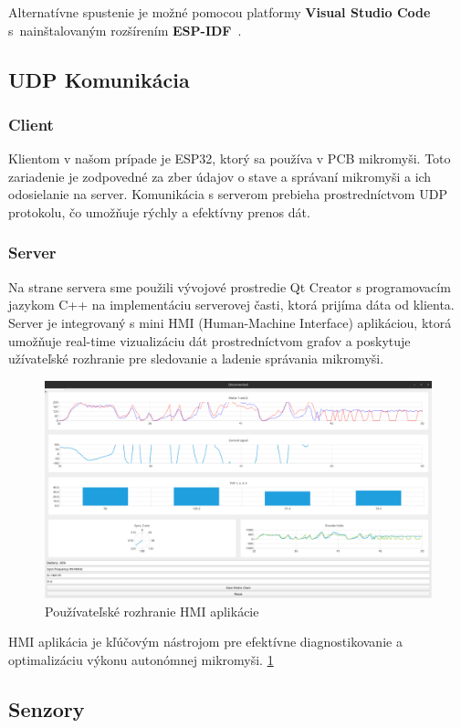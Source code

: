 Alternatívne spustenie je možné pomocou platformy \textbf{Visual Studio Code} s~nainštalovaným rozšírením
\textbf{ESP-IDF}~\cite{espIDF}.
\subsection{UDP Komunikácia}
\subsubsection{Client}
Klientom v našom prípade je ESP32, ktorý sa používa v PCB mikromyši. Toto zariadenie je zodpovedné za zber údajov o stave a správaní mikromyši a ich odosielanie na server. Komunikácia s serverom prebieha prostredníctvom UDP protokolu, čo umožňuje rýchly a efektívny prenos dát.
\subsubsection{Server}
Na strane servera sme použili vývojové prostredie Qt Creator s programovacím jazykom C++ na implementáciu serverovej časti, ktorá prijíma dáta od klienta. Server je integrovaný s mini HMI (Human-Machine Interface) aplikáciou, ktorá umožňuje real-time vizualizáciu dát prostredníctvom grafov a poskytuje užívateľské rozhranie pre sledovanie a ladenie správania mikromyši.
\begin{figure}[!htpb]
    \centering
    \includegraphics[width=15cm]{includes//images/image.png}
    \caption{Používateľské rozhranie HMI aplikácie }
    \label{fig:UDP}
\end{figure}
HMI aplikácia je kľúčovým nástrojom pre efektívne diagnostikovanie a optimalizáciu výkonu autonómnej mikromyši. \ref{fig:UDP} 
\newpage
\subsection{Senzory}

